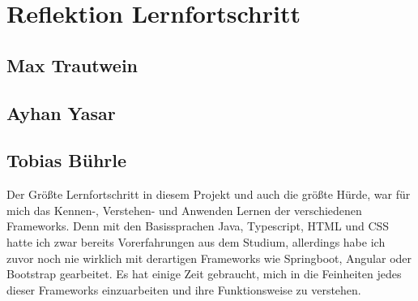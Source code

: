 \chapter{Reflektion Lernfortschritt}\label{ch:reflektion-lernfortschritt}


\section{Max Trautwein}


\section{Ayhan Yasar}


\section{Tobias Bührle}
Der Größte Lernfortschritt in diesem Projekt und auch die größte Hürde, war für mich das 
Kennen-, Verstehen- und Anwenden Lernen der verschiedenen Frameworks. Denn mit den 
Basissprachen Java, Typescript, HTML und CSS hatte ich zwar bereits Vorerfahrungen aus dem 
Studium, allerdings habe ich zuvor noch nie wirklich mit derartigen Frameworks wie 
Springboot, Angular oder Bootstrap gearbeitet. Es hat einige Zeit gebraucht, mich in die 
Feinheiten jedes dieser Frameworks einzuarbeiten und ihre Funktionsweise zu verstehen. 
